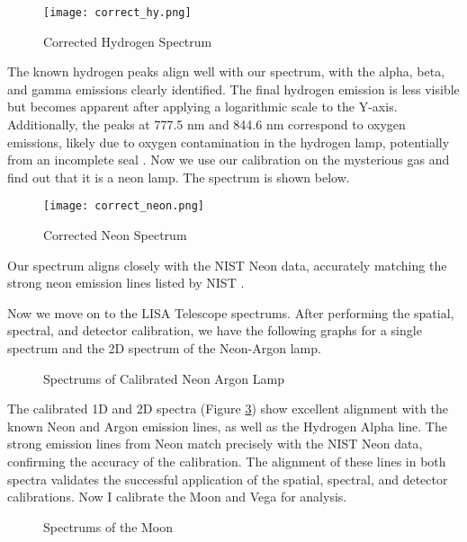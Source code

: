 \documentclass[10pt, preprint]{aastex}
\begin{document}
\begin{figure}[H]
\centering
\texttt{[image: correct\_hy.png]}
\caption{\label{fig:ch}Corrected Hydrogen Spectrum}
\end{figure}


The known hydrogen peaks align well with our spectrum, with the alpha, beta, and gamma emissions clearly identified. The final hydrogen emission is less visible but becomes apparent after applying a logarithmic scale to the Y-axis. Additionally, the peaks at 777.5 nm and 844.6 nm correspond to oxygen emissions, likely due to oxygen contamination in the hydrogen lamp, potentially from an incomplete seal \cite{oxygentable}. Now we use our calibration on the mysterious gas and find out that it is a neon lamp. The spectrum is shown below.

\begin{figure}[H]
\centering
\texttt{[image: correct\_neon.png]}
\caption{\label{fig:ne}Corrected Neon Spectrum}
\end{figure}

Our spectrum aligns closely with the NIST Neon data, accurately matching the strong neon emission lines listed by NIST  
 \cite{nitrogen}.

Now we move on to the LISA Telescope spectrums. After performing the spatial, spectral, and detector calibration, we have the following graphs for a single spectrum and the 2D spectrum of the Neon-Argon lamp.

\begin{figure}[H]
  \centering
  \hfill
  \caption{\label{fig:fsaf}Spectrums of Calibrated Neon Argon Lamp}
\end{figure}

The calibrated 1D and 2D spectra (Figure \ref{fig:fsaf}) show excellent alignment with the known Neon and Argon emission lines, as well as the Hydrogen Alpha line. The strong emission lines from Neon match precisely with the NIST Neon data, confirming the accuracy of the calibration. The alignment of these lines in both spectra validates the successful application of the spatial, spectral, and detector calibrations. Now I calibrate the Moon and Vega for analysis.

\begin{figure}[H]
  \centering
  \hfill
  \caption{\label{fig:moon}Spectrums of the Moon}
\end{figure}
\end{document}
